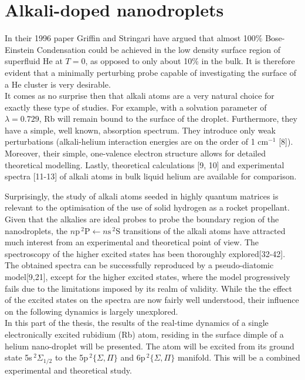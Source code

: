 \chapter{Alkali-doped nanodroplets}

	In their 1996 paper\citep{Griffin1996} Griffin and Stringari have argued that almost 100\% Bose-Einstein Condensation could be achieved in the low density surface region of superfluid He at $T=0$, as opposed to only about 10\% in the bulk. It is therefore evident that a minimally perturbing probe capable of investigating the surface of a He cluster is very desirable.\\

	It comes as no surprise then that alkali atoms are a very natural choice for exactly these type of studies.  For example, with a solvation parameter of $\lambda=0.729$\citep{Anc95}, Rb will remain bound to the surface of the droplet. Furthermore, they have a simple, well known, absorption spectrum. They introduce only weak perturbations (alkali-helium interaction energies are on the order of 1 cm$^{-1}$ [8]). Moreover, their simple, one-valence electron structure allows for detailed theoretical modelling. Lastly, theoretical calculations [9, 10] and experimental spectra [11-13] of alkali atoms in bulk liquid helium are available for comparison.

	Surprisingly, the study of alkali atoms seeded in highly quantum matrices is relevant to the optimisation of the use of solid hydrogen as a rocket propellant\citep{Carrick1993}.\\
	
	Given that the alkalies are ideal probes to probe the boundary region of the nanodroplets, the $n\mathrm{p}\,^2\mathrm{P}\leftarrow n\mathrm{s}\,^2\mathrm{S}$ transitions of the alkali atoms have attracted much interest from an experimental and theoretical point of view. The spectroscopy of the higher excited states has been thoroughly explored[32-42]. The obtained spectra can be successfully reproduced by a pseudo-diatomic model[9,21], except for the higher excited states, where the model progressively fails due to the limitations imposed by its realm of validity. While the the effect of the excited states on the spectra are now fairly well understood, their influence on the following dynamics is largely unexplored.\\
	
	In this part of the thesis, the results of the real-time dynamics of a single electronically excited rubidium (Rb) atom, residing in the surface dimple of a helium nano-droplet will be presented. The atom will be excited from its ground state 5s$\,^2\Sigma_{1/2}$ to the 5p$\,^2\{\Sigma,\Pi\}$ and 6p$\,^2\{\Sigma,\Pi\}$ manifold. This will be a combined experimental and theoretical study.
	
